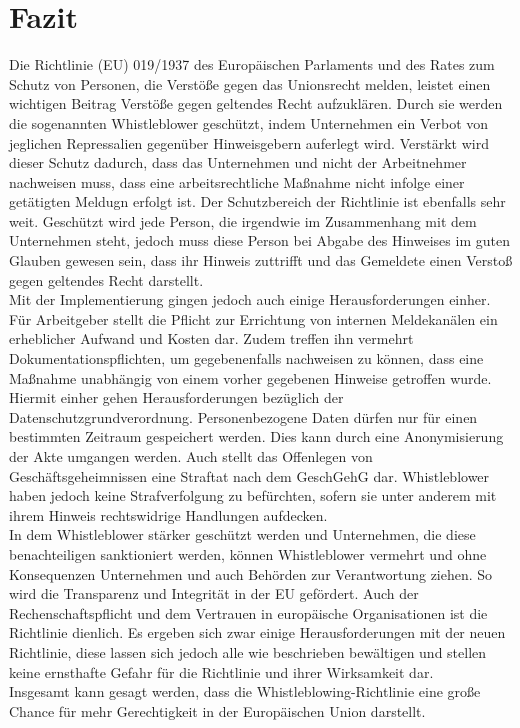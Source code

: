\section{Fazit}
\label{sec:Fazit}
Die Richtlinie (EU) 019/1937 des Europäischen Parlaments und des Rates zum Schutz von Personen, die Verstöße gegen das Unionsrecht melden, leistet einen wichtigen Beitrag Verstöße gegen geltendes Recht aufzuklären.
Durch sie werden die sogenannten Whistleblower geschützt, indem Unternehmen ein Verbot von jeglichen Repressalien gegenüber Hinweisgebern auferlegt wird.
Verstärkt wird dieser Schutz dadurch, dass das Unternehmen und nicht der Arbeitnehmer nachweisen muss, dass eine arbeitsrechtliche Maßnahme nicht infolge einer getätigten Meldugn erfolgt ist.
Der Schutzbereich der Richtlinie ist ebenfalls sehr weit.
Geschützt wird jede Person, die irgendwie im Zusammenhang mit dem Unternehmen steht, jedoch muss diese Person bei Abgabe des Hinweises im guten Glauben gewesen sein, dass ihr Hinweis zuttrifft und das Gemeldete einen Verstoß gegen geltendes Recht darstellt.\\
Mit der Implementierung gingen jedoch auch einige Herausforderungen einher.
Für Arbeitgeber stellt die Pflicht zur Errichtung von internen Meldekanälen ein erheblicher Aufwand und Kosten dar.
Zudem treffen ihn vermehrt Dokumentationspflichten, um gegebenenfalls nachweisen zu können, dass eine Maßnahme unabhängig von einem vorher gegebenen Hinweise getroffen wurde.
Hiermit einher gehen Herausforderungen bezüglich der Datenschutzgrundverordnung.
Personenbezogene Daten dürfen nur für einen bestimmten Zeitraum gespeichert werden.
Dies kann durch eine Anonymisierung der Akte umgangen werden.
Auch stellt das Offenlegen von Geschäftsgeheimnissen eine Straftat nach dem GeschGehG dar.
Whistleblower haben jedoch keine Strafverfolgung zu befürchten, sofern sie unter anderem mit ihrem Hinweis rechtswidrige Handlungen aufdecken.\\
In dem Whistleblower stärker geschützt werden und Unternehmen, die diese benachteiligen sanktioniert werden, können Whistleblower vermehrt und ohne Konsequenzen Unternehmen und auch Behörden zur Verantwortung ziehen.
So wird die Transparenz und Integrität in der EU gefördert.
Auch der Rechenschaftspflicht und dem Vertrauen in europäische Organisationen ist die Richtlinie dienlich.
Es ergeben sich zwar einige Herausforderungen mit der neuen Richtlinie, diese lassen sich jedoch alle wie beschrieben bewältigen und stellen keine ernsthafte Gefahr für die Richtlinie und ihrer Wirksamkeit dar.\\
Insgesamt kann gesagt werden, dass die Whistleblowing-Richtlinie eine große Chance für mehr Gerechtigkeit in der Europäischen Union darstellt.